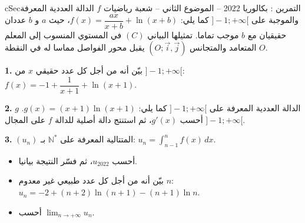 \documentclass[12pt,a4paper]{article}
\newenvironment{BOX}[2]{\begin{otherlanguage}{english}\begin{arbox}{#1}{#2}}{\end{arbox}\end{otherlanguage}}
\newcounter{exo}
\newenvironment{tamrin}[1]{\stepcounter{exo}\begin{BOX}{cSec}{التمرين \theexo: #1}}{\end{BOX}}
\newcommand{\N}{\mathbb{N}}
\newcommand{\limn}{\displaystyle\lim_{n\to+\infty}}
\newenvironment{sq}{\begin{itemize}[leftmargin=2.4em,itemsep=3pt]}{\end{itemize}}
\newcommand{\qa}{\item[(أ)]}\newcommand{\qb}{\item[(ب)]}\newcommand{\qc}{\item[(جـ)]}\newcommand{\qd}{\item[(د)]}\newcommand{\qe}{\item[(هـ)]}
\newcommand{\QQ}[1]{\par\smallskip\textbf{#1.} }
\begin{document}
\begin{tamrin}{بكالوريا 2022 -- الموضوع الثاني -- شعبة رياضيات}
$f$ الدالة العددية المعرفة والموجبة على $]-1;+\infty[$ كما يلي: $f(x)=\dfrac{ax}{x+b}+\ln(x+b)$، حيث $a$ و $b$ عددان حقيقيان مع $b$ موجب تماما. تمثيلها البياني $(C)$ في المستوي المنسوب إلى المعلم المتعامد والمتجانس $(O;\vec i,\vec j)$ يقبل محور الفواصل مماسا له في النقطة $O$.
\QQ{1} بيّن أنه من أجل كل عدد حقيقي $x$ من $]-1;+\infty[$: $f(x)=-1+\dfrac{1}{x+1}+\ln(x+1)$.
\QQ{2} $g$ الدالة العددية المعرفة على $]-1;+\infty[$ كما يلي: $g(x)=(x+1)\ln(x+1)$. أحسب $g'(x)$، ثم استنتج دالة أصلية للدالة $f$ على المجال $]-1;+\infty[$.
\QQ{3} $(u_n)$ المتتالية المعرفة على $\N^*$ بـ: $u_n=\displaystyle\int_{n-1}^nf(x)\,dx$.
\begin{sq}
\qa أحسب $u_{2022}$، ثم فسّر النتيجة بيانيا.
\qb بيّن أنه من أجل كل عدد طبيعي غير معدوم $n$: $u_n=-2+(n+2)\ln(n+1)-(n+1)\ln n$.
\qc أحسب $\limn u_n$.
\end{sq}
\end{tamrin}
\end{document}
